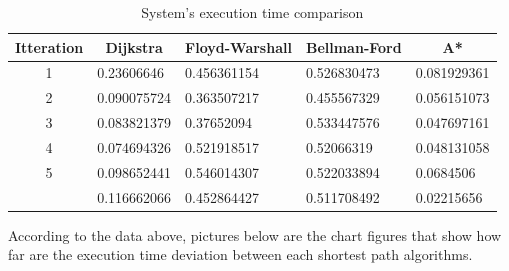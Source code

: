 \begin{table}[h!]
	\centering
	\caption{System's execution time comparison}
	\label{table:4}
	\begin{tabular}{|c|l|l|l|l|}
		\hline
		\textbf{Itteration}                                            & \multicolumn{1}{c|}{\textbf{Dijkstra}} & \multicolumn{1}{c|}{\textbf{Floyd-Warshall}} & \multicolumn{1}{c|}{\textbf{Bellman-Ford}} & \multicolumn{1}{c|}{\textbf{A*}} \\ \hline
		1                                                              & 0.23606646                             & 0.456361154                                  & 0.526830473                                & 0.081929361                      \\ \hline
		2                                                              & 0.090075724                            & 0.363507217                                  & 0.455567329                                & 0.056151073                      \\ \hline
		3                                                              & 0.083821379                            & 0.37652094                                   & 0.533447576                                & 0.047697161                      \\ \hline
		4                                                              & 0.074694326                            & 0.521918517                                  & 0.52066319                                 & 0.048131058                      \\ \hline
		5                                                              & 0.098652441                            & 0.546014307                                  & 0.522033894                                & 0.0684506                        \\ \hline
		\rowcolor[HTML]{9B9B9B} 
		\multicolumn{1}{|l|}{\cellcolor[HTML]{9B9B9B}\textbf{AVERAGE}} & 0.116662066                            & 0.452864427                                  & 0.511708492                                & 0.02215656                       \\ \hline
	\end{tabular}
\end{table}

According to the data above, pictures below are the chart figures that show how far are the execution time deviation between each shortest path algorithms.

